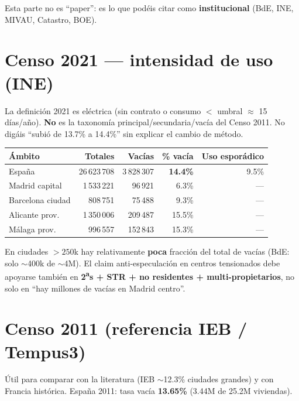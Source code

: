 \documentclass[11pt,a4paper]{report}
\begin{document}
Esta parte no es ``paper'': es lo que pod\'eis citar como \textbf{institucional}
(BdE, INE, MIVAU, Catastro, BOE).

\section{Censo 2021 --- intensidad de uso (INE)}

\begin{cuidado}
La definici\'on 2021 es el\'ectrica (sin contrato o consumo $<$ umbral $\approx$ 15 d\'ias/año).
\textbf{No} es la taxonom\'ia principal/secundaria/vac\'ia del Censo 2011.
No dig\'ais ``subi\'o de 13.7\% a 14.4\%'' sin explicar el cambio de m\'etodo.
\end{cuidado}

\begin{center}
\renewcommand{\arraystretch}{1.15}
\begin{tabular}{@{}lrrrr@{}}
\toprule
\textbf{\'Ambito} & \textbf{Totales} & \textbf{Vac\'ias} & \textbf{\% vac\'ia} & \textbf{Uso espor\'adico} \\
\midrule
España & 26\,623\,708 & 3\,828\,307 & \textbf{14.4\%} & 9.5\% \\
Madrid capital & 1\,533\,221 & 96\,921 & 6.3\% & --- \\
Barcelona ciudad & 808\,751 & 75\,488 & 9.3\% & --- \\
Alicante prov. & 1\,350\,006 & 209\,487 & 15.5\% & --- \\
Málaga prov. & 996\,557 & 152\,843 & 15.3\% & --- \\
\bottomrule
\end{tabular}
\end{center}

\begin{cuidado}
En ciudades $>250$k hay relativamente \textbf{poca} fracci\'on del total de vac\'ias
(BdE: solo $\sim$400k de $\sim$4M). El claim anti-especulaci\'on en centros tensionados
debe apoyarse tambi\'en en \textbf{2\textsuperscript{a}s + STR + no residentes + multi-propietarios},
no solo en ``hay millones de vac\'ias en Madrid centro''.
\end{cuidado}

\section{Censo 2011 (referencia IEB / Tempus3)}

\'Util para comparar con la literatura (IEB $\sim$12.3\% ciudades grandes) y con
Francia hist\'orica. Espa\~na 2011: tasa vac\'ia \textbf{13.65\%}
(3.44M de 25.2M viviendas).
\end{document}
